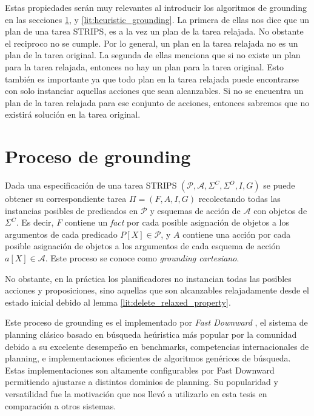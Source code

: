 Estas propiedades serán muy relevantes al introducir los algoritmos de grounding
en las secciones \ref{lit:relaxed_grounding}, y \ref{lit:heuristic_grounding}.
La primera de ellas nos dice que un plan de una tarea STRIPS, es a la vez un
plan de la tarea relajada. No obstante el reciproco no se cumple. Por lo
general, un plan en la tarea relajada no es un plan de la tarea original. La
segunda de ellas menciona que si no existe un plan para la tarea relajada,
entonces no hay un plan para la tarea original. Esto también es importante ya
que todo plan en la tarea relajada puede encontrarse con solo instanciar
aquellas acciones que sean alcanzables. Si no se encuentra un plan de la tarea
relajada para ese conjunto de acciones, entonces sabremos que no existirá
solución en la tarea original.

\section{Proceso de grounding}
\label{lit:relaxed_grounding}

Dada una especificación de una tarea STRIPS $(\mathcal{P}, \mathcal{A},
\Sigma^{C}, \Sigma^{O}, I, G)$ se puede obtener su correspondiente tarea $\Pi =
(F, A, I, G)$ recolectando todas las instancias posibles de predicados en
$\mathcal{P}$ y esquemas de acción de $\mathcal{A}$ con objetos de $\Sigma^{C}$.
Es decir, $F$ contiene un \emph{fact} por cada posible asignación de objetos a
los argumentos de cada predicado $P[X] \in \mathcal{P}$, y $A$ contiene una
acción por cada posible asignación de objetos a los argumentos de cada esquema
de acción $a[X] \in \mathcal{A}$. Este proceso se conoce como \emph{grounding
cartesiano}.

No obstante, en la práctica los planificadores no instancian todas las posibles
acciones y proposiciones, sino aquellas que son alcanzables relajadamente desde
el estado inicial debido al lemma \ref{lit:delete_relaxed_property}. 

Este proceso de grounding es el implementado por \emph{Fast Downward}
\citep{Helmert-2011}, el sistema de planning clásico basado en búsqueda
heúristica más popular por la comunidad debido a su excelente desempeño en
benchmarks, competencias internacionales de planning, e implementaciones
eficientes de algoritmos genéricos de búsqueda. Estas implementaciones son
altamente configurables por Fast Downward permitiendo ajustarse a distintos
dominios de planning. Su popularidad y versatilidad fue la motivación que nos
llevó a utilizarlo en esta tesis en comparación a otros sistemas.


